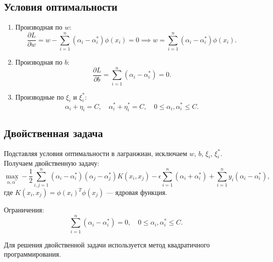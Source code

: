 \subsection{Условия оптимальности}
\begin{enumerate}
    \item Производная по \(w\):
    \begin{equation*}
        \frac{\partial L}{\partial w} = w - \sum_{i=1}^n (\alpha_i - \alpha_i^*) \phi(x_i) = 0 \implies 
        w = \sum_{i=1}^n (\alpha_i - \alpha_i^*) \phi(x_i).
    \end{equation*}
    \item Производная по \(b\):
    \begin{equation*}
        \frac{\partial L}{\partial b} = \sum_{i=1}^n (\alpha_i - \alpha_i^*) = 0.
    \end{equation*}
    \item Производные по \(\xi_i\) и \(\xi_i^*\):
    \begin{equation*}
        \alpha_i + \eta_i = C, \quad \alpha_i^* + \eta_i^* = C, \quad 0 \leq \alpha_i, \alpha_i^* \leq C.
    \end{equation*}
\end{enumerate}

\subsection{Двойственная задача}
\par Подставляя условия оптимальности в лагранжиан, исключаем \(w\), \(b\), \(\xi_i\), \(\xi_i^*\). Получаем двойственную задачу:
\begin{equation*}
    \max_{\alpha, \alpha^*} -\frac{1}{2} \sum_{i,j=1}^n (\alpha_i - \alpha_i^*)(\alpha_j - \alpha_j^*) K(x_i, x_j) 
    - \epsilon \sum_{i=1}^n (\alpha_i + \alpha_i^*) + \sum_{i=1}^n y_i (\alpha_i - \alpha_i^*),
\end{equation*}
где \(K(x_i, x_j) = \phi(x_i)^T \phi(x_j)\) — ядровая функция.
\par Ограничения:
\begin{equation*}
    \sum_{i=1}^n (\alpha_i - \alpha_i^*) = 0, \quad 0 \leq \alpha_i, \alpha_i^* \leq C.
\end{equation*}
\par Для решения двойственной задачи используется метод квадратичного программирования.

